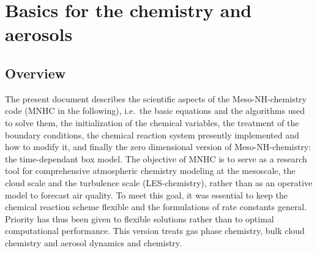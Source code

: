 %
\newcommand{\ddt}{\frac{\partial}{\partial t}}
\newcommand{\rhod}{\rho_{\rm dref}}
\newcommand{\scalar}[1]{{s}_\ast^{(#1)}} 
\newcommand{\source}[1]{{\cal S}_\ast^{(#1)}}
\newcommand{\divergence}{{\vec\nabla\cdot}}
\newcommand{\NEQ}{N_{\rm eq}}
\newcommand{\NREAC}{N_{\rm reac}}
\newcommand{\avg}[1]{\overline{#1}}
\newcommand{\Pmuavg}{{P_\mu^{\rm avg}}}
\newcommand{\Pmusub}{{P_\mu^{\rm sub}}}
\newcommand{\fmuavg}{{f_\mu^{\rm avg}}}
\newcommand{\fmusub}{{f_\mu^{\rm sub}}}
%
\newcommand{\refs}[1]{{\small\par%
\noindent\global\hangindent=1cm\global\hangafter=1{#1}\par}}
%
\newcommand{\ul}[1]{$\underline{\mbox{#1}}$}
\newcommand{\oxy}{\mbox{O($^{1}$D)}}
\newcommand{\ogr}{\mbox{O($^{3}$P)}}
\newcommand{\oxyd}{\mbox{O$_2$}}
\newcommand{\ozo}{\mbox{O$_3$}}
\newcommand{\oxo}{\mbox{O$_4$}}
\newcommand{\sul}{\mbox{S$_2$}}
\newcommand{\hyd}{\mbox{H$_2$}}
\newcommand{\oio}{\mbox{O${_{4}}{^{2-}}$}}
\newcommand{\met}{\mbox{CH$_4$}}
\newcommand{\hem}{\mbox{N$_2$O}}
\newcommand{\dio}{\mbox{CO$_2$}}
\newcommand{\atm}{\mbox{atmosphere}}
\newcommand{\mol}{\mbox{molecules}}
\newcommand{\dep}{\mbox{deposition}}
\newcommand{\res}{\mbox{resistance}}
\newcommand{\vd}{\mbox{$v_d$}}
\newcommand{\degree}{\mbox{^{\circ}}}
%
%
%
%
\chapter{Basics for the chemistry and aerosols}
\minitoc
%
\section{Overview}
%
The present document describes the scientific aspects of the 
Meso-NH-chemistry code (MNHC in the following), i.e.~the basic equations and
the algorithms used to solve them,
the initialization of the chemical variables, 
the treatment of the boundary conditions, 
the chemical reaction system presently implemented and
how to modify it, and finally the zero dimensional version
of Meso-NH-chemistry: the time-dependant box model.
%
The objective of MNHC
is to serve as a research tool for comprehensive atmospheric
chemistry modeling at the mesoscale, the cloud scale and the
turbulence scale (LES-chemistry), rather than as an operative
model to forecast air quality.
To meet this goal, it was essential to keep the chemical reaction
scheme flexible and the formulations of rate constants general.
Priority has thus been given to flexible solutions rather than
to optimal computational performance.
This version treats gas phase chemistry, 
bulk cloud chemistry and aerosol dynamics and chemistry.

